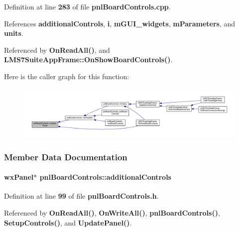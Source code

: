 Definition at line {\bf 283} of file {\bf pnl\+Board\+Controls.\+cpp}.



References {\bf additional\+Controls}, {\bf i}, {\bf m\+G\+U\+I\+\_\+widgets}, {\bf m\+Parameters}, and {\bf units}.



Referenced by {\bf On\+Read\+All()}, and {\bf L\+M\+S7\+Suite\+App\+Frame\+::\+On\+Show\+Board\+Controls()}.



Here is the caller graph for this function\+:
\nopagebreak
\begin{figure}[H]
\begin{center}
\leavevmode
\includegraphics[width=350pt]{df/d93/classpnlBoardControls_a106998007da4aeb2879808503fdc44dd_icgraph}
\end{center}
\end{figure}




\subsubsection{Member Data Documentation}
\paragraph[{additional\+Controls}]{\setlength{\rightskip}{0pt plus 5cm}wx\+Panel$\ast$ pnl\+Board\+Controls\+::additional\+Controls\hspace{0.3cm}{\ttfamily [protected]}}\label{classpnlBoardControls_a3b0d74c66b008ab380599cc4060017d8}


Definition at line {\bf 99} of file {\bf pnl\+Board\+Controls.\+h}.



Referenced by {\bf On\+Read\+All()}, {\bf On\+Write\+All()}, {\bf pnl\+Board\+Controls()}, {\bf Setup\+Controls()}, and {\bf Update\+Panel()}.

